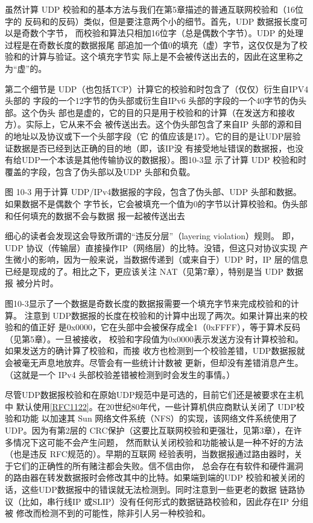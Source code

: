 虽然计算 UDP 校验和的基本方法与我们在第5章描述的普通互联网校验和（16位字的
反码和的反码）类似，但是要注意两个小的细节。首先，UDP 数据报长度可以是奇数个字节，
而校验和算法只相加16位字（总是偶数个字节）。UDP 的处理过程是在奇数长度的数据报尾
部追加一个值0的填充（虚）字节，这仅仅是为了校验和的计算与验证。这个填充字节实
际上是不会被传送出去的，因此在这里称之为“虚”的。

第二个细节是 UDP（也包括TCP）计算它的校验和时包含了（仅仅）衍生自IPV4头部的
字段的一个12字节的伪头部或衍生自IPv6 头部的字段的一个40字节的伪头部。这个伪头
部也是虚的，它的目的只是用于校验和的计算（在发送方和接收方）。实际上，它从来不会
被传送出去。这个伪头部包含了来自IP 头部的源和目的地址以及协议或下一个头部字段（它
的值应该是17）。它的目的是让UDP层验证数据是否已经到达正确的目的地（即，该IP没
有接受地址错误的数据报，也没有给UDP一个本该是其他传输协议的数据报）。图10-3显
示了计算 UDP 校验和时覆盖的字段，包含了伪头部以及UDP 头部和负载。

图 10-3 用于计算 UDP/IPv4数据报的字段，包含了伪头部、UDP 头部和数据。如果数据不是偶数个
字节长，它会被填充一个值为0的字节以计算校验和。伪头部和任何填充的数据不会与数据
报一起被传送出去

\begin{tcolorbox}
  细心的读者会发现这会导致所谓的“违反分层”（layering violation）规则。
  即，UDP 协议（传输层）直接操作IP（网络层）的比特。没错，但这只对协议实现
  产生微小的影响，因为一般来说，当数据传递到（或来自于）UDP 时，IP 层的信息
  已经是现成的了。相比之下，更应该关注 NAT（见第7章），特别是当 UDP 数据报
  被分片时。
\end{tcolorbox}

图10-3显示了一个数据是奇数长度的数据报需要一个填充字节来完成校验和的计算。
注意到 UDP数据报的长度在校验和的计算中出现了两次。如果计算出来的校验和的值正好
是0x0000，它在头部中会被保存成全1（0xFFFF），等于算术反码（见第5章）。一旦被接收，
校验和字段值为0x0000表示发送方没有计算校验和。如果发送方的确计算了校验和，而接
收方也检测到一个校验差错，UDP数据报就会被毫无声息地放弃。尽管会有一些统计计数被
更新，但却没有差错消息产生。（这就是一个 IPv4 头部校验差错被检测到时会发生的事情。）

尽管UDP数据报校验和在原始UDP规范中是可选的，目前它们还是被要求在主机中
默认使用\href{https://www.rfc-editor.org/rfc/rfc1122}{[RFC1122]}。在20世纪80年代，一些计算机供应商默认关闭了
UDP校验和功能
以加速其 Sun 网络文件系统（NFS）的实现，该网络文件系统使用了 UDP。因为有第2层的
CRC保护（这要比互联网校验和更强壮，见第3章），在许多情况下这可能不会产生问题，
然而默认关闭校验和功能被认是一种不好的方法（也是违反 RFC规范的）。早期的互联网
经验表明，当数据报通过路由器时，关于它们的正确性的所有赌注都会失败。信不信由你，
总会存在有软件和硬件漏洞的路由器在转发数据报时会修改其中的比特。如果端到端的UDP
校验和被关闭的话，这些UDP数据报中的错误就无法检测到。同时注意到一些更老的数据
链路协议（比如，串行线IP 或SLIP）没有任何形式的数据链路校验和，因此存在IP 分组被
修改而检测不到的可能性，除非引人另一种校验和。

